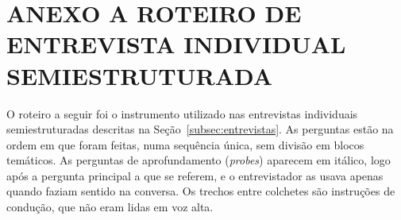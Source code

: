 %

\section*{ANEXO A \textendash{} ROTEIRO DE ENTREVISTA INDIVIDUAL SEMIESTRUTURADA}
\label{anexo:roteiro_entrevistas}

O roteiro a seguir foi o instrumento utilizado nas entrevistas individuais semiestruturadas descritas na Seção~\ref{subsec:entrevistas}. As perguntas estão na ordem em que foram feitas, numa sequência única, sem divisão em blocos temáticos. As perguntas de aprofundamento (\textit{probes}) aparecem em itálico, logo após a pergunta principal a que se referem, e o entrevistador as usava apenas quando faziam sentido na conversa. Os trechos entre colchetes são instruções de condução, que não eram lidas em voz alta.

